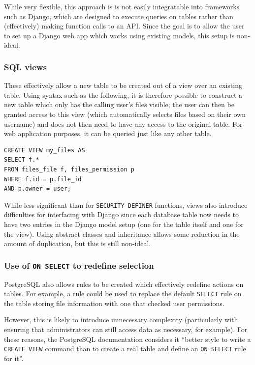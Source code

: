 \documentclass{article}
\begin{document}
While very flexible, this approach is is not easily integratable into frameworks such as Django, which are designed to execute queries on tables rather than (effectively) making function calls to an API. Since the goal is to allow the user to set up a Django web app which works using existing models, this setup is non-ideal.

\subsubsection{SQL views}
These effectively allow a new table to be created out of a view over an existing table. Using syntax such as the following, it is therefore possible to construct a new table which only has the calling user's files visible; the user can then be granted access to this view (which automatically selects files based on their own username) and does not then need to have any access to the original table. For web application purposes, it can be queried just like any other table.

\begin{verbatim}
CREATE VIEW my_files AS
SELECT f.*
FROM files_file f, files_permission p
WHERE f.id = p.file_id
AND p.owner = user;
\end{verbatim}

While less significant than for \texttt{SECURITY DEFINER} functions, views also introduce difficulties for interfacing with Django since each database table now needs to have two entries in the Django model setup (one for the table itself and one for the view). Using abstract classes and inheritance allows some reduction in the amount of duplication, but this is still non-ideal.

\subsubsection{Use of \texttt{ON SELECT} to redefine selection}
PostgreSQL also allows rules to be created which effectively redefine actions on tables. For example, a rule could be used to replace the default \texttt{SELECT} rule on the table storing file information with one that checked user permissions.

However, this is likely to introduce unnecessary complexity (particularly with ensuring that administrators can still access data as necessary, for example). For these reasons, the PostgreSQL documentation considers it ``better style to write a \texttt{CREATE VIEW} command than to create a real table and define an \texttt{ON SELECT} rule for it''\cite{postgres-CREATE_RULE}.
\end{document}
